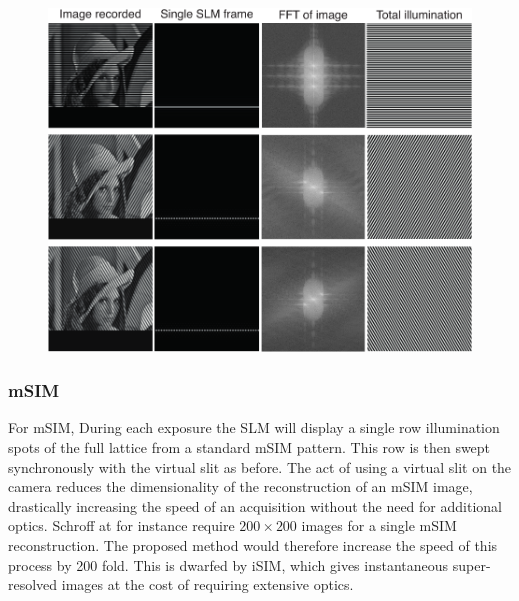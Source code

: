 \begin{figure}
  \centering
  \includegraphics{sim_slit}
  \caption{}
  \label{fig:sim_slit}
\end{figure}

\subsubsection{mSIM}

For mSIM, During each exposure the SLM will display a single row illumination spots of the full lattice from a standard mSIM pattern.
This row is then swept synchronously with the virtual slit as before.
The act of using a virtual slit on the camera reduces the dimensionality of the reconstruction of an mSIM image, drastically increasing the speed of an acquisition without the need for additional optics.
Schroff at for instance require $200 \times 200$ images for a single mSIM reconstruction.
The proposed method would therefore increase the speed of this process by 200 fold.
This is dwarfed by iSIM, which gives instantaneous super-resolved images at the cost of requiring extensive optics.

